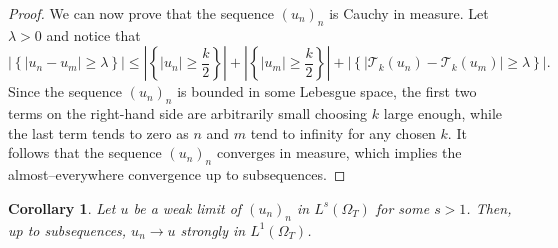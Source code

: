\documentclass{amsart}
\numberwithin{equation}{section}
\newtheorem{cor}[example]{Corollary}
\def\elleomT#1{L^{#1}(\Omega_T)}
\newcommand{\abs}[1]{\left|#1\right|}
\begin{document}
\begin{proof}
    We can now prove that the sequence $(u_n)_n$ is Cauchy in measure. Let $\lambda>0$ and notice that
    $$\abs{\left\{ \abs{u_n-u_m}\geq \lambda \right\}}\leq \abs{\left\{ \abs{u_n}\geq \frac{k}{2} \right\}}+\abs{\left\{ \abs{u_m}\geq \frac{k}{2} \right\}}+\abs{\left\{ \abs{\mathcal {T}_k (u_n)-\mathcal {T}_k (u_m)}\geq \lambda \right\}}.$$
    Since the sequence $(u_n)_n$ is bounded in some Lebesgue space, the first two terms on the right-hand side are arbitrarily small choosing $k$ large enough, while the last term tends to zero as $n$ and $m$ tend to infinity for any chosen $k$. It follows that the sequence $(u_n)_n$ converges in measure, which implies the almost--everywhere convergence up to subsequences.
\end{proof}

\begin{cor}\label{cor:strongconvL1}
    Let $u$ be a weak limit of $(u_n)_n$ in $\elleomT s$ for some $s>1$. Then, up to subsequences, $u_n\to u$ strongly in $\elleomT1$.
\end{cor}
\end{document}
